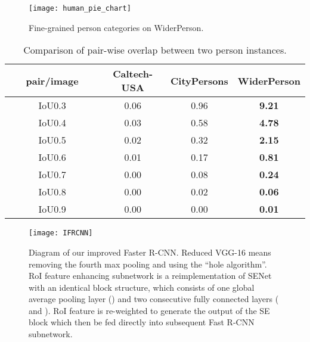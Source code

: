 \documentclass[journal]{IEEEtran}
\begin{document}
\begin{figure}
\begin{centering}
\texttt{[image: human\_pie\_chart]}
\par\end{centering}
\caption{Fine-grained person categories on WiderPerson.}
\label{fig:human-categories}
\end{figure}

\begin{table}[t]
\caption{Comparison of pair-wise overlap between two person instances.} \label{tab:PairOverlap}
\begin{center}
\begin{tabular}{c|ccc}
\toprule[2pt]
{\ \ \ pair/image\ \ \ } & {Caltech-USA} & {CityPersons} & {WiderPerson} \\
\midrule
{IoU0.3} & {0.06} & {0.96} & \bf{9.21} \\
{IoU0.4} & {0.03} & {0.58} & \bf{4.78} \\
{IoU0.5} & {0.02} & {0.32} & \bf{2.15} \\
{IoU0.6} & {0.01} & {0.17} & \bf{0.81} \\
{IoU0.7} & {0.00} & {0.08} & \bf{0.24} \\
{IoU0.8} & {0.00} & {0.02} & \bf{0.06} \\
{IoU0.9} & {0.00} & {0.00} & \bf{0.01} \\
\bottomrule[2pt]
\end{tabular}
\end{center}
\end{table}

\begin{figure*}
\begin{centering}
\texttt{[image: IFRCNN]}
\par\end{centering}
\caption{Diagram of our improved Faster R-CNN. Reduced VGG-16 means removing the fourth max pooling and using the ``hole algorithm''. RoI feature enhancing subnetwork is a reimplementation of SENet with an identical block structure, which consists of one global average pooling layer () and two consecutive fully connected layers ( and ). RoI feature {} is re-weighted to generate the output \emph{} of the SE block which then be fed directly into subsequent Fast R-CNN subnetwork.}
\label{fig:ifrcnn}
\end{figure*}
\end{document}
